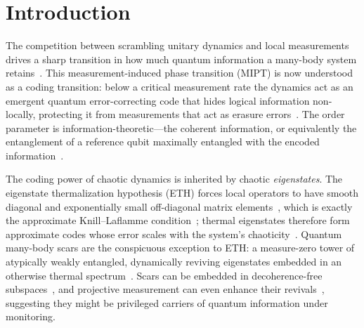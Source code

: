 \documentclass[aps,prb,twocolumn]{revtex4-2}
\begin{document}
\maketitle


\section{Introduction}

The competition between scrambling unitary dynamics and local measurements
drives a sharp transition in how much quantum information a many-body system
retains~\cite{Li2018MIPT,Li2019,Skinner2019,Chan2019,Bao2020,Jian2020,Fisher2023}. This measurement-induced phase
transition (MIPT) is now understood as a coding transition: below a critical
measurement rate the dynamics act as an emergent quantum error-correcting code
that hides logical information non-locally, protecting it from measurements that
act as erasure errors~\cite{Choi2020,Gullans2020,Fan2021}. The order parameter
is information-theoretic---the coherent information, or equivalently the
entanglement of a reference qubit maximally entangled with the encoded
information~\cite{Gullans2020,Gullans2020b,Qian2024}.

The coding power of chaotic dynamics is inherited by chaotic \emph{eigenstates}.
The eigenstate thermalization hypothesis (ETH) forces local operators to have
smooth diagonal and exponentially small off-diagonal matrix
elements~\cite{Deutsch1991,Srednicki1994,Rigol2008,DAlessio2016}, which is
exactly the approximate Knill--Laflamme condition~\cite{KnillLaflamme1997};
thermal eigenstates therefore form approximate codes whose error scales with the
system's chaoticity~\cite{Brandao2019,BaoCheng2019,Qasim2025}. Quantum many-body scars are the
conspicuous exception to ETH: a measure-zero tower of atypically weakly
entangled, dynamically reviving eigenstates embedded in an otherwise thermal
spectrum~\cite{Bernien2017,Turner2018,Turner2018b,Serbyn2021,Moudgalya2022}.
Scars can be embedded in decoherence-free
subspaces~\cite{Zanardi1997,Lidar1998,WangDFS2024}, and projective measurement can
even enhance their revivals~\cite{Paviglianiti2025}, suggesting they might be
privileged carriers of quantum information under monitoring.
\end{document}
